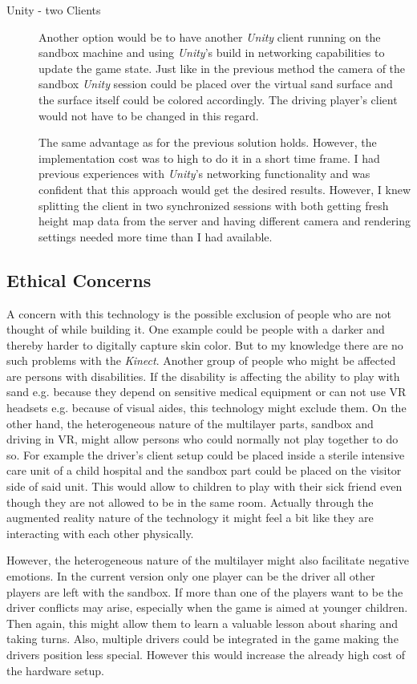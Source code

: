 \documentclass[12pt,a4paper,twoside,titlepage,headsepline,numbers=noenddot,listof=totoc,index=totoc,bibliography=totoc]{scrartcl}
\theoremstyle{break}
\begin{document}
\begin{description}
	\item[Unity - two Clients] Another option would be to have another \textit{Unity} client running on the sandbox machine and using \textit{Unity}'s build in networking capabilities to update the game state. Just like in the previous method the camera of the sandbox \textit{Unity} session could be placed over the virtual sand surface and the surface itself could be colored accordingly. The driving player's client would not have to be changed in this regard.
	
	The same advantage as for the previous solution holds. However, the implementation cost was to high to do it in a short time frame. I had previous experiences with \textit{Unity}'s networking functionality and was confident that this approach would get the desired results. However, I knew splitting the client in two synchronized sessions with both getting fresh height map data from the server and having different camera and rendering settings needed more time than I had available.
\end{description}

\subsection{Ethical Concerns}
A concern with this technology is the possible exclusion of people who are not thought of while building it. One example could be people with a darker and thereby harder to digitally capture skin color. But to my knowledge there are no such problems with the \textit{Kinect}. Another group of people who might be affected are persons with disabilities. If the disability is affecting the ability to play with sand e.g. because they depend on sensitive medical equipment or can not use VR headsets e.g. because of visual aides, this technology might exclude them. On the other hand, the heterogeneous nature of the multilayer parts, sandbox and driving in VR, might allow persons who could normally not play together to do so. For example the driver's client setup could be placed inside a sterile intensive care unit of a child hospital and the sandbox part could be placed on the visitor side of said unit. This would allow to children to play with their sick friend even though they are not allowed to be in the same room. Actually through the augmented reality nature of the technology it might feel a bit like they are interacting with each other physically.  

However, the heterogeneous nature of the multilayer might also facilitate negative emotions. In the current version only one player can be the driver all other players are left with the sandbox. If more than one of the players want to be the driver conflicts may arise, especially when the game is aimed at younger children. Then again, this might allow them to learn a valuable lesson about sharing and taking turns. Also, multiple drivers could be integrated in the game making the drivers position less special. However this would increase the already high cost of the hardware setup.
\end{document}

